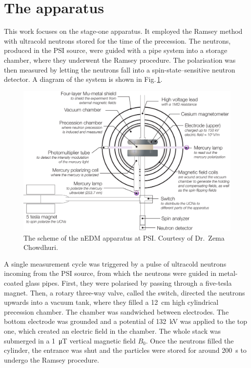 \section{The apparatus}
This work focuses on the stage-one apparatus.
It employed the Ramsey method with ultracold neutrons stored for the time of the precession.
The neutrons, produced in the PSI source, were guided with a pipe system into a storage chamber, where they underwent the Ramsey procedure.
The polarisation was then measured by letting the neutrons fall into a spin-state--sensitive neutron detector.
A diagram of the system is shown in Fig.\,\ref{fig:nEDM_scheme}.

\begin{figure}
  \centering
  \includegraphics[width=\linewidth]{gfx/nEDMatPSI/apparatus-cartoon-main-and-sub-labels.pdf}
  \caption{The scheme of the nEDM apparatus at PSI\@. Courtesy of Dr.\ Zema Chowdhuri. }\label{fig:nEDM_scheme}
\end{figure}

A single measurement cycle was triggered by a pulse of ultracold neutrons incoming from the PSI source, from which the neutrons were guided in metal-coated glass pipes.
First, they were polarised by passing through a five-tesla magnet.
Then, a rotary three-way valve, called the switch, directed the neutrons upwards into a vacuum tank, where they filled a \SI{12}{\centi\meter} high cylindrical precession chamber.
The chamber was sandwiched between electrodes. The bottom electrode was grounded and a potential of \SI{132}{\kilo\volt} was applied to the top one, which created an electric field in the chamber.
The whole stack was submerged in a \SI{1}{\micro\tesla} vertical magnetic field $B_0$.
Once the neutrons filled the cylinder, the entrance was shut and the particles were stored for around \SI{200}{\second} to undergo the Ramsey procedure.


